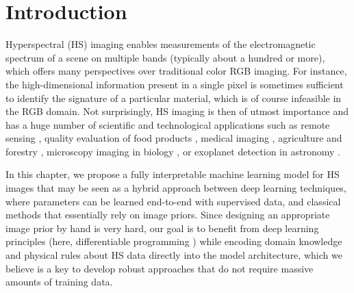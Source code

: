 \newpage
\minitoc

\section{Introduction}

Hyperspectral (HS) imaging enables measurements of the electromagnetic spectrum of a scene on
multiple bands (typically about a hundred or more), which offers many perspectives over traditional color RGB imaging. 
For instance, the high-dimensional information present in a single pixel is sometimes sufficient to identify the signature of a particular material, which is of course infeasible in the RGB domain. 
Not surprisingly, HS imaging is then of utmost importance and has a huge number of scientific and technological applications such as remote sensing \cite{bioucas-dias_hyperspectral_2013, goetz_three_2009, manolakis_hyperspectral_2016},
quality evaluation of food products \cite{elmasry_principles_2012, feng_application_2012, liu_hyperspectral_2017}, medical imaging \cite{akbari_hyperspectral_2012, fei_chapter_2020, lu_medical_2014}, agriculture and forestry
\cite{adao_hyperspectral_2017, lu_recent_2020, mahesh_hyperspectral_2015}, microscopy imaging in biology \cite{gowen_recent_2015, studer_compressive_2012}, or exoplanet detection in astronomy \cite{gonzalez_supervised_2018}.

In this chapter, we propose a fully interpretable machine learning model for HS images
that may be seen as a hybrid approach between deep learning techniques, where parameters can be
learned end-to-end with supervised data, and classical methods that essentially rely on image priors.
Since designing an appropriate image prior by hand is very hard, our goal is to benefit from deep
learning principles (here, differentiable programming \cite{baydin_automatic_2018}) while encoding domain knowledge and physical rules about HS data directly into the model architecture, which we believe is a key to develop robust approaches that do not require massive amounts of training data.


